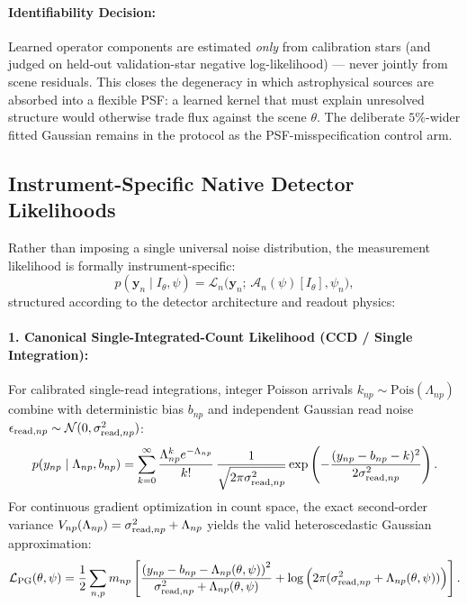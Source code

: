 \documentclass[11pt,a4paper]{article}
\begin{document}
\paragraph{Identifiability Decision:}
Learned operator components are estimated \emph{only} from calibration stars (and judged on held-out validation-star negative log-likelihood) --- never jointly from scene residuals. This closes the degeneracy in which astrophysical sources are absorbed into a flexible PSF: a learned kernel that must explain unresolved structure would otherwise trade flux against the scene $\theta$. The deliberate $5\%$-wider fitted Gaussian remains in the protocol as the PSF-misspecification control arm.

\subsection{Instrument-Specific Native Detector Likelihoods}
\label{subsec:likelihoods}

Rather than imposing a single universal noise distribution, the measurement likelihood is formally instrument-specific:
\begin{equation}
p(\boldsymbol{y}_n \mid I_\theta, \psi) = \mathcal{L}_n\Big( \boldsymbol{y}_n ;\, \mathcal{A}_n(\psi)[I_\theta], \psi_n \Big),
\end{equation}
structured according to the detector architecture and readout physics:

\paragraph{1. Canonical Single-Integrated-Count Likelihood (CCD / Single Integration):}
For calibrated single-read integrations, integer Poisson arrivals $k_{np} \sim \mathrm{Pois}(\Lambda_{np})$ combine with deterministic bias $b_{np}$ and independent Gaussian read noise $\epsilon_{{\rm read}, np} \sim \mathcal{N}(0, \sigma_{{\rm read}, np}^2)$:
\begin{equation}
p(y_{np} \mid \Lambda_{np}, b_{np}) = \sum_{k=0}^{\infty} \frac{\Lambda_{np}^k e^{-\Lambda_{np}}}{k!} \, \frac{1}{\sqrt{2\pi \sigma_{{\rm read}, np}^2}} \exp\left( -\frac{(y_{np} - b_{np} - k)^2}{2\sigma_{{\rm read}, np}^2} \right).
\end{equation}
For continuous gradient optimization in count space, the exact second-order variance $V_{np}(\Lambda_{np}) = \sigma_{{\rm read}, np}^2 + \Lambda_{np}$ yields the valid heteroscedastic Gaussian approximation:
\begin{equation}
\mathcal{L}_{\rm PG}(\theta, \psi) = \frac{1}{2} \sum_{n, p} m_{np} \left[ \frac{\left( y_{np} - b_{np} - \Lambda_{np}(\theta, \psi) \right)^2}{\sigma_{{\rm read}, np}^2 + \Lambda_{np}(\theta, \psi)} + \log\Big( 2\pi (\sigma_{{\rm read}, np}^2 + \Lambda_{np}(\theta, \psi)) \Big) \right].
\end{equation}
\end{document}
